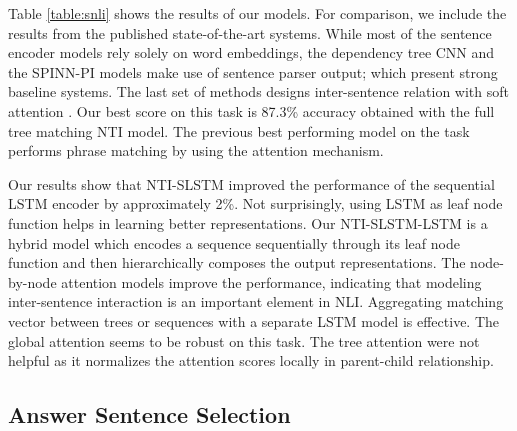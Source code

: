 \documentclass[11pt]{article}
\begin{document}
Table \ref{table:snli} shows the results of our models. For comparison, we include the results from the published state-of-the-art systems.
While most of the sentence encoder models rely solely on word embeddings, the dependency tree CNN and the SPINN-PI models make use of sentence parser output; which present strong baseline systems. The last set of methods designs inter-sentence relation with soft attention \cite{bahdanau:15}. Our best score on this task is 87.3\% accuracy obtained with the full tree matching NTI model. The previous best performing model on the task performs phrase matching by using the attention mechanism. 

Our results show that NTI-SLSTM improved the performance of the sequential LSTM encoder by approximately 2\%. Not surprisingly, using LSTM as leaf node function helps in learning better representations. Our NTI-SLSTM-LSTM is a hybrid model which encodes a sequence sequentially through its leaf node function and then hierarchically composes the output representations. The node-by-node attention models improve the performance, indicating that modeling inter-sentence interaction is an important element in NLI. Aggregating matching vector between trees or sequences with a separate LSTM model is effective. The global attention seems to be robust on this task. The tree attention were not helpful as it normalizes the attention scores locally in parent-child relationship.

\subsection{Answer Sentence Selection}
\end{document}
